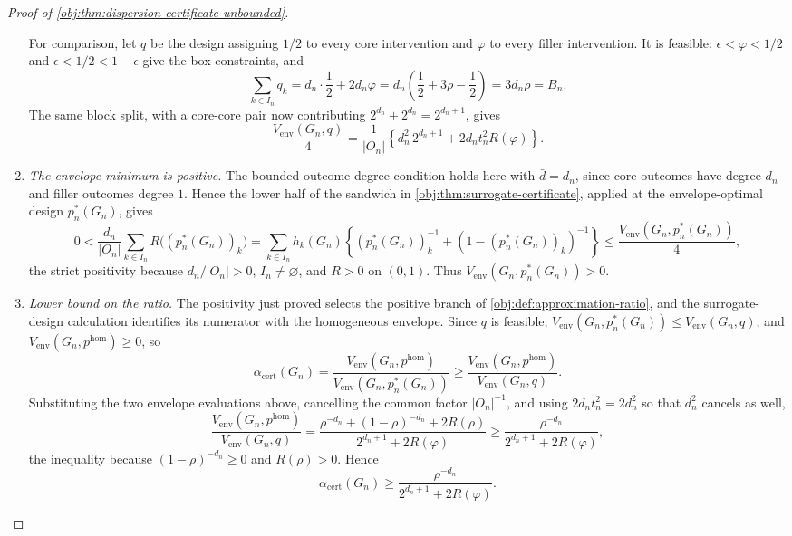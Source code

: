 \documentclass[11pt]{article}
\begin{document}
\begin{proof}[Proof of \cref{obj:thm:dispersion-certificate-unbounded}]
\begin{enumerate}
For comparison, let \(q\) be the design assigning \(1/2\) to every core intervention and \(\varphi\) to every filler intervention.  It is feasible: \(\epsilon<\varphi<1/2\) and \(\epsilon<1/2<1-\epsilon\) give the box constraints, and
\[
\sum_{k\in I_n}q_k=d_n\cdot\frac12+2d_n\varphi
=d_n\left(\frac12+3\rho-\frac12\right)=3d_n\rho=B_n .
\]
The same block split, with a core-core pair now contributing \(2^{d_n}+2^{d_n}=2^{d_n+1}\), gives
\[
\frac{V_{\mathrm{env}}(G_n,q)}{4}
=\frac{1}{|O_n|}
\left\{
d_n^2\,2^{d_n+1}
+2d_nt_n^2R(\varphi)
\right\}.
\]

\item \textit{The envelope minimum is positive.}  The bounded-outcome-degree condition holds here with \(\bar d=d_n\), since core outcomes have degree \(d_n\) and filler outcomes degree \(1\).  Hence the lower half of the sandwich in \cref{obj:thm:surrogate-certificate}, applied at the envelope-optimal design \(p_n^*(G_n)\), gives
\[
0<\frac{d_n}{|O_n|}\sum_{k\in I_n}R\bigl((p_n^*(G_n))_k\bigr)
=\sum_{k\in I_n}h_k(G_n)\left\{(p_n^*(G_n))_k^{-1}+(1-(p_n^*(G_n))_k)^{-1}\right\}
\leq\frac{V_{\mathrm{env}}(G_n,p_n^*(G_n))}{4},
\]
the strict positivity because \(d_n/|O_n|>0\), \(I_n\neq\varnothing\), and \(R>0\) on \((0,1)\).  Thus
\(V_{\mathrm{env}}(G_n,p_n^*(G_n))>0\).

\item \textit{Lower bound on the ratio.}  The positivity just proved selects the positive branch of \cref{obj:def:approximation-ratio}, and the surrogate-design calculation identifies its numerator with the homogeneous envelope.  Since \(q\) is feasible, \(V_{\mathrm{env}}(G_n,p_n^*(G_n))\le V_{\mathrm{env}}(G_n,q)\), and \(V_{\mathrm{env}}(G_n,p^{\mathrm{hom}})\ge0\), so
\[
\alpha_{\mathrm{cert}}(G_n)
=\frac{V_{\mathrm{env}}(G_n,p^{\mathrm{hom}})}{V_{\mathrm{env}}(G_n,p_n^*(G_n))}
\geq
\frac{V_{\mathrm{env}}(G_n,p^{\mathrm{hom}})}{V_{\mathrm{env}}(G_n,q)} .
\]
Substituting the two envelope evaluations above, cancelling the common factor \(|O_n|^{-1}\), and using \(2d_nt_n^2=2d_n^2\) so that \(d_n^2\) cancels as well,
\[
\frac{V_{\mathrm{env}}(G_n,p^{\mathrm{hom}})}{V_{\mathrm{env}}(G_n,q)}
=\frac{\rho^{-d_n}+(1-\rho)^{-d_n}+2R(\rho)}
      {2^{d_n+1}+2R(\varphi)}
\geq
\frac{\rho^{-d_n}}
 {2^{d_n+1}+2R(\varphi)},
\]
the inequality because \((1-\rho)^{-d_n}\ge0\) and \(R(\rho)>0\).  Hence
\[
\alpha_{\mathrm{cert}}(G_n)\geq
\frac{\rho^{-d_n}}
 {2^{d_n+1}+2R(\varphi)} .
\]


\end{enumerate}
\end{proof}
\end{document}
